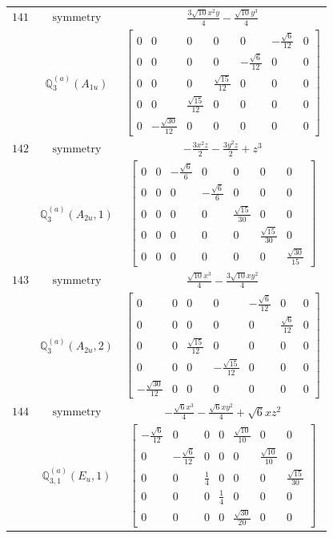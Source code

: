 \documentclass[fleqn,8pt,landscape]{jsarticle}
\begin{document}
\begin{longtable}{ccc}
$ 141 $ & $ \text{symmetry} $ & $ \frac{3 \sqrt{10} x^{2} y}{4} - \frac{\sqrt{10} y^{3}}{4} $ \\
$  $ & $ \mathbb{Q}_{3}^{(a)}(A_{1u}) $ & $ \begin{bmatrix} 0 & 0 & 0 & 0 & 0 & - \frac{\sqrt{6}}{12} & 0 \\ 0 & 0 & 0 & 0 & - \frac{\sqrt{6}}{12} & 0 & 0 \\ 0 & 0 & 0 & \frac{\sqrt{15}}{12} & 0 & 0 & 0 \\ 0 & 0 & \frac{\sqrt{15}}{12} & 0 & 0 & 0 & 0 \\ 0 & - \frac{\sqrt{30}}{12} & 0 & 0 & 0 & 0 & 0 \end{bmatrix} $ \\ \hline
$ 142 $ & $ \text{symmetry} $ & $ - \frac{3 x^{2} z}{2} - \frac{3 y^{2} z}{2} + z^{3} $ \\
$  $ & $ \mathbb{Q}_{3}^{(a)}(A_{2u},1) $ & $ \begin{bmatrix} 0 & 0 & - \frac{\sqrt{6}}{6} & 0 & 0 & 0 & 0 \\ 0 & 0 & 0 & - \frac{\sqrt{6}}{6} & 0 & 0 & 0 \\ 0 & 0 & 0 & 0 & \frac{\sqrt{15}}{30} & 0 & 0 \\ 0 & 0 & 0 & 0 & 0 & \frac{\sqrt{15}}{30} & 0 \\ 0 & 0 & 0 & 0 & 0 & 0 & \frac{\sqrt{30}}{15} \end{bmatrix} $ \\ \hline
$ 143 $ & $ \text{symmetry} $ & $ \frac{\sqrt{10} x^{3}}{4} - \frac{3 \sqrt{10} x y^{2}}{4} $ \\
$  $ & $ \mathbb{Q}_{3}^{(a)}(A_{2u},2) $ & $ \begin{bmatrix} 0 & 0 & 0 & 0 & - \frac{\sqrt{6}}{12} & 0 & 0 \\ 0 & 0 & 0 & 0 & 0 & \frac{\sqrt{6}}{12} & 0 \\ 0 & 0 & \frac{\sqrt{15}}{12} & 0 & 0 & 0 & 0 \\ 0 & 0 & 0 & - \frac{\sqrt{15}}{12} & 0 & 0 & 0 \\ - \frac{\sqrt{30}}{12} & 0 & 0 & 0 & 0 & 0 & 0 \end{bmatrix} $ \\ \hline
$ 144 $ & $ \text{symmetry} $ & $ - \frac{\sqrt{6} x^{3}}{4} - \frac{\sqrt{6} x y^{2}}{4} + \sqrt{6} x z^{2} $ \\
$  $ & $ \mathbb{Q}_{3,1}^{(a)}(E_{u},1) $ & $ \begin{bmatrix} - \frac{\sqrt{6}}{12} & 0 & 0 & 0 & \frac{\sqrt{10}}{10} & 0 & 0 \\ 0 & - \frac{\sqrt{6}}{12} & 0 & 0 & 0 & \frac{\sqrt{10}}{10} & 0 \\ 0 & 0 & \frac{1}{4} & 0 & 0 & 0 & \frac{\sqrt{15}}{30} \\ 0 & 0 & 0 & \frac{1}{4} & 0 & 0 & 0 \\ 0 & 0 & 0 & 0 & \frac{\sqrt{30}}{20} & 0 & 0 \end{bmatrix} $ \\ \hline

\end{longtable}
\end{document}
